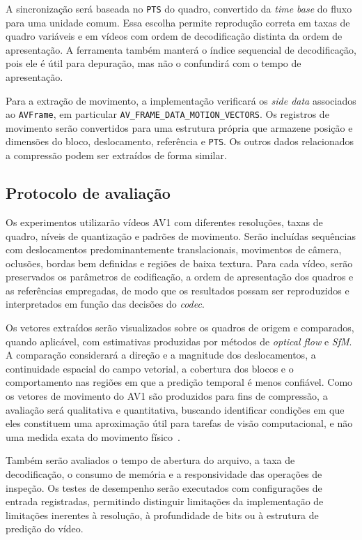 \documentclass[a4paper,titlepage]{article}
\begin{document}
A sincronização será baseada no \texttt{PTS} do quadro, convertido da \emph{time base} do fluxo para uma unidade comum. Essa escolha permite reprodução correta em taxas de quadro variáveis e em vídeos com ordem de decodificação distinta da ordem de apresentação. A ferramenta também manterá o índice sequencial de decodificação, pois ele é útil para depuração, mas não o confundirá com o tempo de apresentação.

Para a extração de movimento, a implementação verificará os \emph{side data} associados ao \texttt{AVFrame}, em particular \texttt{AV\_FRAME\_DATA\_MOTION\_VECTORS}. Os registros de movimento serão convertidos para uma estrutura própria que armazene posição e dimensões do bloco, deslocamento, referência e \texttt{PTS}. Os outros dados relacionados a compressão podem ser extraídos de forma similar.

\subsection{Protocolo de avaliação}

Os experimentos utilizarão vídeos AV1 com diferentes resoluções, taxas de quadro, níveis de quantização e padrões de movimento. Serão incluídas sequências com deslocamentos predominantemente translacionais, movimentos de câmera, oclusões, bordas bem definidas e regiões de baixa textura. Para cada vídeo, serão preservados os parâmetros de codificação, a ordem de apresentação dos quadros e as referências empregadas, de modo que os resultados possam ser reproduzidos e interpretados em função das decisões do \emph{codec}.

Os vetores extraídos serão visualizados sobre os quadros de origem e comparados, quando aplicável, com estimativas produzidas por métodos de \emph{optical flow} e \emph{SfM}. A comparação considerará a direção e a magnitude dos deslocamentos, a continuidade espacial do campo vetorial, a cobertura dos blocos e o comportamento nas regiões em que a predição temporal é menos confiável. Como os vetores de movimento do AV1 são produzidos para fins de compressão, a avaliação será qualitativa e quantitativa, buscando identificar condições em que eles constituem uma aproximação útil para tarefas de visão computacional, e não uma medida exata do movimento físico~\cite{av1motion,computer_vision}.

Também serão avaliados o tempo de abertura do arquivo, a taxa de decodificação, o consumo de memória e a responsividade das operações de inspeção. Os testes de desempenho serão executados com configurações de entrada registradas, permitindo distinguir limitações da implementação de limitações inerentes à resolução, à profundidade de bits ou à estrutura de predição do vídeo.
\end{document}
